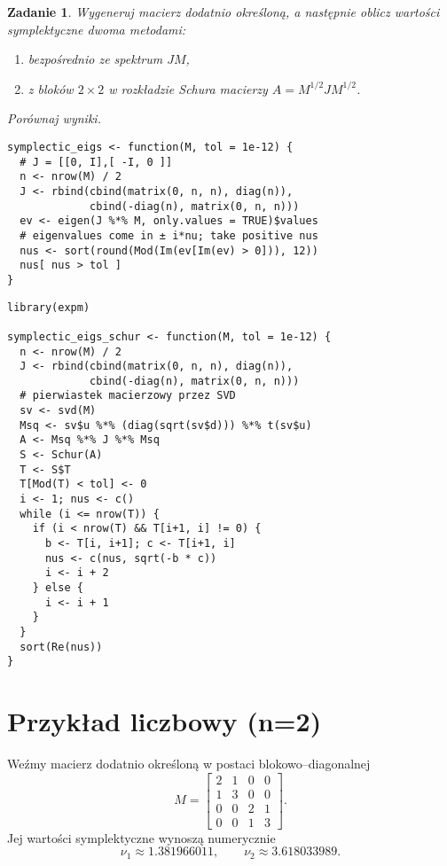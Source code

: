 \documentclass[12pt]{article}
\newtheorem{exer}{Zadanie}
\begin{document}
\begin{exer}
Wygeneruj macierz dodatnio określoną, a następnie oblicz wartości symplektyczne
dwoma metodami:
\begin{enumerate}[label=(\alph*)]
\item bezpośrednio ze spektrum $JM$,
\item z bloków $2\times 2$ w rozkładzie Schura macierzy $A=M^{1/2}JM^{1/2}$.
\end{enumerate}
Porównaj wyniki.
\end{exer}

\begin{verbatim}
symplectic_eigs <- function(M, tol = 1e-12) {
  # J = [[0, I],[ -I, 0 ]]
  n <- nrow(M) / 2
  J <- rbind(cbind(matrix(0, n, n), diag(n)),
             cbind(-diag(n), matrix(0, n, n)))
  ev <- eigen(J %*% M, only.values = TRUE)$values
  # eigenvalues come in ± i*nu; take positive nus
  nus <- sort(round(Mod(Im(ev[Im(ev) > 0])), 12))
  nus[ nus > tol ]
}
\end{verbatim}

\begin{verbatim}
library(expm)

symplectic_eigs_schur <- function(M, tol = 1e-12) {
  n <- nrow(M) / 2
  J <- rbind(cbind(matrix(0, n, n), diag(n)),
             cbind(-diag(n), matrix(0, n, n)))
  # pierwiastek macierzowy przez SVD
  sv <- svd(M)
  Msq <- sv$u %*% (diag(sqrt(sv$d))) %*% t(sv$u)
  A <- Msq %*% J %*% Msq
  S <- Schur(A)
  T <- S$T
  T[Mod(T) < tol] <- 0
  i <- 1; nus <- c()
  while (i <= nrow(T)) {
    if (i < nrow(T) && T[i+1, i] != 0) {
      b <- T[i, i+1]; c <- T[i+1, i]
      nus <- c(nus, sqrt(-b * c))
      i <- i + 2
    } else {
      i <- i + 1
    }
  }
  sort(Re(nus))
}
\end{verbatim}

\section*{Przykład liczbowy (n=2)}

Weźmy macierz dodatnio określoną w postaci blokowo–diagonalnej
\[
M=\begin{bmatrix}
2 & 1 & 0 & 0\\
1 & 3 & 0 & 0\\
0 & 0 & 2 & 1\\
0 & 0 & 1 & 3
\end{bmatrix}.
\]
Jej wartości symplektyczne wynoszą numerycznie
\[
\nu_1 \approx 1.381966011,\qquad
\nu_2 \approx 3.618033989.
\]
\end{document}
